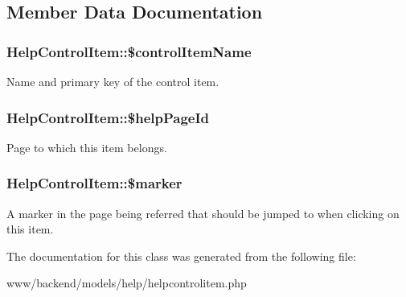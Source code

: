 \subsection{Member Data Documentation}
\hypertarget{classHelpControlItem_a7a88d6210fbb29d8bcb290e05280efa3}{
\subsubsection[{\$controlItemName}]{\setlength{\rightskip}{0pt plus 5cm}HelpControlItem::\$controlItemName}}
\label{classHelpControlItem_a7a88d6210fbb29d8bcb290e05280efa3}
Name and primary key of the control item. \hypertarget{classHelpControlItem_abc1c05f3f2ec4fe0e4fd7a76b9c847ec}{
\subsubsection[{\$helpPageId}]{\setlength{\rightskip}{0pt plus 5cm}HelpControlItem::\$helpPageId}}
\label{classHelpControlItem_abc1c05f3f2ec4fe0e4fd7a76b9c847ec}
Page to which this item belongs. \hypertarget{classHelpControlItem_a1c202f78644b96d3e2406e8d2d430a03}{
\subsubsection[{\$marker}]{\setlength{\rightskip}{0pt plus 5cm}HelpControlItem::\$marker}}
\label{classHelpControlItem_a1c202f78644b96d3e2406e8d2d430a03}
A marker in the page being referred that should be jumped to when clicking on this item. 

The documentation for this class was generated from the following file:\begin{DoxyCompactItemize}
\item 
www/backend/models/help/helpcontrolitem.php\end{DoxyCompactItemize}
